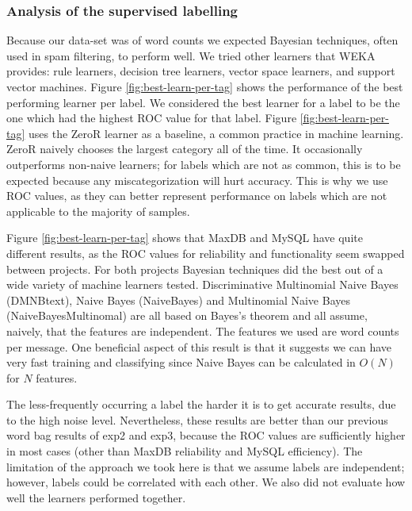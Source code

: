 \documentclass[]{sig-alternate}
\begin{document}
\subsubsection{Analysis of the supervised labelling}
\label{sec:suplabelling}
Because our data-set was of word counts we expected Bayesian techniques, often used in spam filtering, to perform well. We tried other learners that WEKA~\cite{weka09} provides: rule learners, decision tree learners, vector space learners, and support vector machines.  Figure \ref{fig:best-learn-per-tag} shows the performance of the best performing learner per label.  We considered the best learner for a label to be the one which had the highest ROC value for that label. Figure \ref{fig:best-learn-per-tag} uses the ZeroR learner as a baseline, a common practice in machine learning. ZeroR naively chooses the largest category all of the time. It occasionally outperforms non-naive learners; for labels which are not as common, this is to be expected because any miscategorization will hurt accuracy. This is why we use ROC values, as they can better represent performance on labels which are not applicable to the majority of samples.

Figure \ref{fig:best-learn-per-tag} shows that MaxDB and MySQL have quite different results, as the ROC values for reliability and functionality seem swapped between projects. For both projects Bayesian techniques did the best out of a wide variety of machine learners tested. Discriminative Multinomial Naive Bayes (DMNBtext), Naive Bayes (NaiveBayes) and Multinomial Naive Bayes (NaiveBayesMultinomal) are all based on Bayes's theorem and all assume, naively, that the features are independent. The features we used are word counts per message. One beneficial aspect of this result is that it suggests we can have very fast training and classifying  since Naive Bayes can be calculated in $O(N)$ for $N$ features.

The less-frequently occurring a label the harder it is to get accurate results, due to the high noise level. Nevertheless, these results are better than our previous word bag results of \textsf{exp2} and \textsf{exp3}, because the ROC values are sufficiently higher in most cases (other than MaxDB reliability and MySQL efficiency). The limitation of the approach we took here is that we assume labels are independent; however, labels could be correlated with each other. We also did not evaluate how well the learners performed together.
\end{document}
